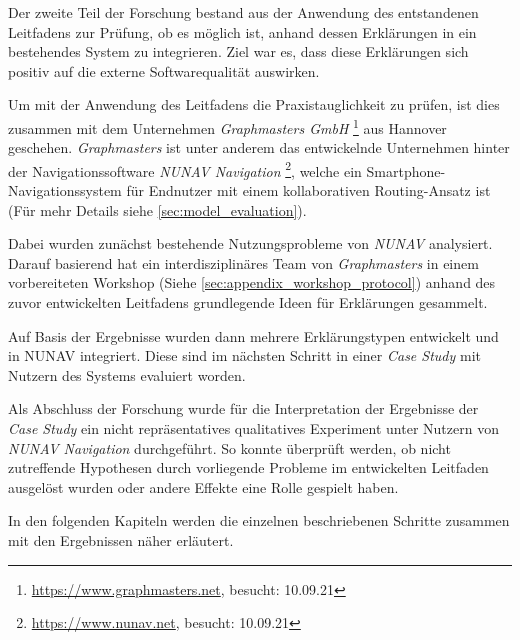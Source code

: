 \bigbreak

Der zweite Teil der Forschung bestand aus der Anwendung des entstandenen Leitfadens zur Prüfung, ob es möglich ist, anhand dessen Erklärungen in ein bestehendes System zu integrieren. Ziel war es, dass diese Erklärungen sich positiv auf die externe Softwarequalität auswirken.

Um mit der Anwendung des Leitfadens die Praxistauglichkeit zu prüfen, ist dies zusammen mit dem Unternehmen \textit{Graphmasters GmbH} \footnote{\url{https://www.graphmasters.net}, besucht: 10.09.21} aus Hannover geschehen. \textit{Graphmasters} ist unter anderem das entwickelnde Unternehmen hinter der Navigationssoftware \textit{NUNAV Navigation} \footnote{\url{https://www.nunav.net}, besucht: 10.09.21}, welche ein Smartphone-Navigationssystem für Endnutzer mit einem kollaborativen Routing-Ansatz ist (Für mehr Details siehe \autoref{sec:model_evaluation}).

Dabei wurden zunächst bestehende Nutzungsprobleme von \textit{NUNAV} analysiert. Darauf basierend hat ein interdisziplinäres Team von \textit{Graphmasters} in einem vorbereiteten Workshop (Siehe \autoref{sec:appendix_workshop_protocol}) anhand des zuvor entwickelten Leitfadens grundlegende Ideen für Erklärungen gesammelt.

Auf Basis der Ergebnisse wurden dann mehrere Erklärungstypen entwickelt und in NUNAV integriert. Diese sind im nächsten Schritt in einer \textit{Case Study} mit Nutzern des Systems evaluiert worden.

Als Abschluss der Forschung wurde für die Interpretation der Ergebnisse der \textit{Case Study} ein nicht repräsentatives qualitatives Experiment unter Nutzern von \textit{NUNAV Navigation} durchgeführt. So konnte überprüft werden, ob nicht zutreffende Hypothesen durch vorliegende Probleme im entwickelten Leitfaden ausgelöst wurden oder andere Effekte eine Rolle gespielt haben.

\bigskip

In den folgenden Kapiteln werden die einzelnen beschriebenen Schritte zusammen mit den Ergebnissen näher erläutert.